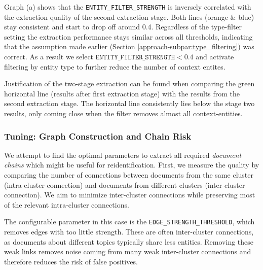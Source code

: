 Graph (a) shows that the \texttt{ENTITY\_FILTER\_STRENGTH} is inversely correlated with the extraction quality of the second extraction stage. Both lines (orange \& blue) stay consistent and start to drop off around 0.4. Regardless of the type-filter setting the extraction performance stays similar across all thresholds, indicating that the assumption made earlier (Section \ref{approach-subpar:type_filtering}) was correct. As a result we select $\texttt{ENTITY\_FILTER\_STRENGTH} < 0.4$ and activate filtering by entity type to further reduce the number of context entites.

Justification of the two-stage extraction can be found when comparing the green horizontal line (results after first extraction stage) with the results from the second extraction stage. The horizontal line consistently lies below the stage two results, only coming close when the filter removes almost all context-entities.

\subsubsection{Tuning: Graph Construction and Chain Risk}
We attempt to find the optimal parameters to extract all required \textit{document chains} which might be useful for reidentification. First, we measure the quality by comparing the number of connections between documents from the same cluster (intra-cluster connection) and documents from different clusters (inter-cluster connection). We aim to minimize inter-cluster connections while preserving most of the relevant intra-cluster connections.

The configurable parameter in this case is the \texttt{EDGE\_STRENGTH\_THRESHOLD}, which removes edges with too little strength. These are often inter-cluster connections, as documents about different topics typically share less entities. Removing these weak links
removes noise coming from many weak inter-cluster connections and therefore reduces the risk of false positives.

